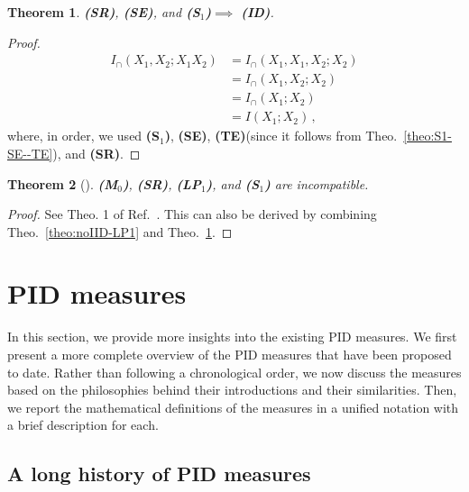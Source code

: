 \documentclass{article}
\newcommand{\ts}[1]{\ensuremath{_{\text{#1}}}}
\newcommand{\SR}{\textbf{(SR)}\xspace} %
\newcommand{\Mz}{\textbf{(M\ts{0})}\xspace} %
\newcommand{\ID}{\textbf{(ID)}\xspace} %
\newcommand{\So}{\textbf{(S\ts{1})}\xspace} %
\newcommand{\LPo}{\textbf{(LP\ts{1})}\xspace} %
\newcommand{\TE}{\textbf{(TE)}\xspace} %
\newcommand{\SE}{\textbf{(SE)}\xspace} %
\newtheorem{theorem}{Theorem}
\begin{document}
\begin{theorem} \label{theo:SR-SE-So--ID}
    \SR, \SE, and \So $\implies$ \ID.
\end{theorem}
\begin{proof}
    \begin{equation}
    \begin{aligned}
        I_\cap(X_1,X_2;X_1X_2) & = I_\cap(X_1,X_1,X_2;X_2) \\
        & = I_\cap(X_1,X_2;X_2) \\
        & = I_\cap(X_1;X_2) \\
        & = I(X_1;X_2) \,,
    \end{aligned}
    \end{equation}
    where, in order, we used \So, \SE, \TE (since it follows from Theo.~\ref{theo:S1-SE--TE}), and \SR.
\end{proof}

\begin{theorem}[\!\!\cite{bertschinger2013shared}] \label{theo:noSo}
     \Mz, \SR, \LPo, and \So are incompatible.
\end{theorem}
\begin{proof}
    See Theo. 1 of Ref.~\cite{bertschinger2013shared}. This can also be derived by combining  Theo.~\ref{theo:noIID-LP1} and Theo.~\ref{theo:SR-SE-So--ID}. 
\end{proof}




\section{PID measures}

In this section, we provide more insights into the existing PID measures. We first present a more complete overview of the PID measures that have been proposed to date. Rather than following a chronological order, we now discuss the measures based on the philosophies behind their introductions and their similarities.
Then, we report the mathematical definitions of the measures in a unified notation with a brief description for each. 

\subsection{A long history of PID measures}
\label{sec:long_history}
\end{document}

